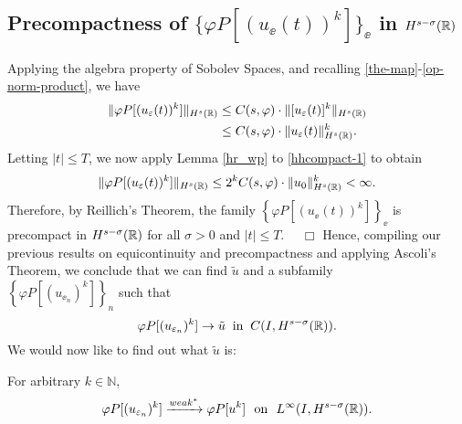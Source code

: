 		\subsection{Precompactness of $\{\varphi P [(u_\ee(t))^k]\}_\ee$ in
		$H^{s-\sigma  }(\mathbb{R})$}
		Applying the algebra property of Sobolev
		Spaces, and recalling \eqref{the-map}-\eqref{op-norm-product}, we have
		\begin{equation}
			\begin{split}
			\label{hhcompact-1}
			 \|\varphi P [(u_\varepsilon(t))^k]\|_{H^{s}(\mathbb{R})}
			& \le  C(s, \varphi) \cdot \|[u_\varepsilon(t)]^k\|_{H^{s}(\mathbb{R})}
			\\
			& \le C(s, \varphi) \cdot \|u_\varepsilon(t)\|^k_{H^{s}(\mathbb{R})}.
			\end{split}
		\end{equation}
		Letting $|t| \le T$, we now apply Lemma \ref{hr_wp} to
		\eqref{hhcompact-1} to obtain
		\begin{equation*}
			\begin{split}
			\|\varphi P [(u_\varepsilon(t))^k]\|_{H^{s}(\mathbb{R})}
			\le 2^k C(s, \varphi) \cdot  \|u_0 \|^k_{H^s(\mathbb{R})} < \infty.
			\end{split}
		\end{equation*}
		Therefore, by Reillich's Theorem, the family $\left\{
		\varphi P [(u_\ee(t))^k] \right\}_\ee$ is
		precompact in $H^{s- \sigma }(\mathbb{R})$ for all $\sigma > 0$ and $|t| \le T$. $\quad
		\Box$ 
		Hence, compiling our previous results on equicontinuity and precompactness
		and applying Ascoli's Theorem, we
		conclude that we can find $\tilde{u}$ and a subfamily 
		\\ $\left\{
		\varphi P [(u_{\ee_n})^k]
		\right\}_n$ such that
		\begin{equation}
			\label{hhstrong-conv-of-u_ep}
			\varphi P [(u_{\varepsilon_n})^k] \to \tilde{u}
			\; \; \text{in} \; \; C(I, H^{s-\sigma}(\mathbb{R})).
		\end{equation}
		We would now like to find out what $\tilde{u}$ is:
		\begin{lemma}
			\label{hhlem:crit-conv}
			For arbitrary $k \in \mathbb{N}$,
			\begin{equation}
				\begin{split}
					\varphi P [(u_{\varepsilon_n})^k] \xrightarrow{weak^*}
					\varphi P [u^k] \ \ \text{on} \ \ L^\infty(I,
					H^{s-\sigma}(\mathbb{R})).
					\label{hhcrit-conv-est}
				\end{split}
			\end{equation}
		\end{lemma}

